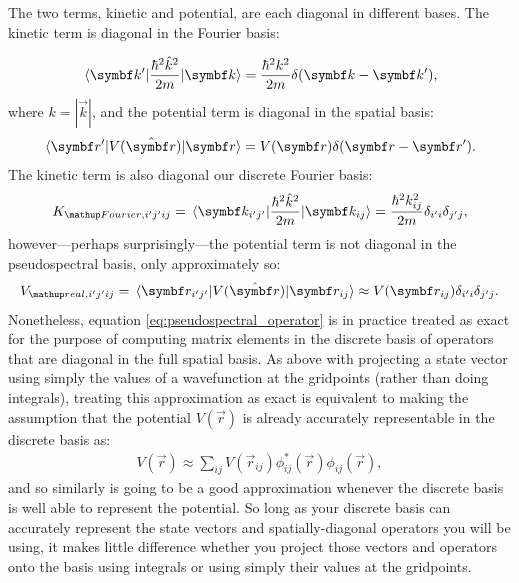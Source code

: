 The two terms, kinetic and potential, are each diagonal in different bases. The kinetic term is diagonal in the Fourier basis:

\begin{align}
\matrixel{\vec k^\prime}{\frac{\hbar^2 \hat k^2}{2m}}{\vec k} = \frac{\hbar^2 k^2}{2m}\delta(\vec k - \vec k^\prime),
\end{align}
where $k = |\vec k|$, and the potential term is diagonal in the spatial basis:
\begin{align}
\matrixel{\vec r^\prime}{V(\hat{\vec r})}{\vec r} = V(\vec r) \delta(\vec r - \vec r^\prime).
\end{align}
The kinetic term is also diagonal our discrete Fourier basis:
\begin{align}
K_{\up{Fourier}, i^\prime j^\prime i j} = \matrixel{\vec k_{i^\prime j^\prime}}{\frac{\hbar^2 \hat k^2}{2m}}{\vec k_{i j}} = \frac{\hbar^2 k_{i j}^2}{2m}\delta_{i^\prime i}\delta_{j^\prime j},
\end{align}
however---perhaps surprisingly---the potential term is not diagonal in the pseudospectral basis, only approximately so:
\begin{align}\label{eq:pseudospectral_operator}
V_{\up{real}, i^\prime j^\prime i j} = \matrixel{\vec r_{i^\prime j^\prime}}{V(\hat{\vec r})}{\vec r_{i j}} \approx V(\vec r_{i j}) \delta_{i^\prime i}\delta_{j^\prime j}.
\end{align}
Nonetheless, equation \eqref{eq:pseudospectral_operator} is in practice treated as exact for the purpose of computing matrix elements in the discrete basis of operators that are diagonal in the full spatial basis. As above with projecting a state vector using simply the values of a wavefunction at the gridpoints (rather than doing integrals), treating this approximation as exact is equivalent to making the assumption that the potential $V(\vec r)$ is already accurately representable in the discrete basis as:
\begin{align}
V(\vec r) \approx \sum_{ij} V(\vec r_{ij}) \phi^\ast_{ij}(\vec r)\phi_{ij}(\vec r),
\end{align}
and so similarly is going to be a good approximation whenever the discrete basis is well able to represent the potential. So long as your discrete basis can accurately represent the state vectors and spatially-diagonal operators you will be using, it makes little difference whether you project those vectors and operators onto the basis using integrals or using simply their values at the gridpoints.

